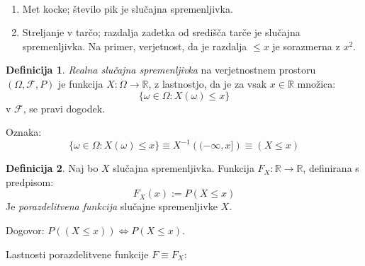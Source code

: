 \documentclass[12pt]{book}
\def\n{\noindent}
\theoremstyle{definition}
\newtheorem{definicija}{Definicija}
\theoremstyle{plain}
\theoremstyle{plain}
\theoremstyle{plain}
\theoremstyle{remark}
\begin{document}
\begin{zgled}
    ~

    \begin{enumerate} 
        \item Met kocke; število pik je slučajna spremenljivka.
        \item Streljanje v tarčo; razdalja zadetka od središča tarče je slučajna spremenljivka. 
        Na primer, verjetnost, da je razdalja $\leq x$ je sorazmerna z $x^2$.
    \end{enumerate}
\end{zgled}

\begin{definicija}
    \emph{Realna slučajna spremenljivka} na verjetnostnem prostoru $(\Omega, \mathcal{F}, P)$ je funkcija $X: \Omega \to \mathbb{R}$, z lastnostjo, da je za vsak $x \in \mathbb{R}$ množica:
    $$
    \{\omega \in \Omega: X(\omega) \leq x\}
    $$
    v $\mathcal{F}$, se pravi dogodek.
\end{definicija}

\n Oznaka: 
$$
\{\omega \in \Omega: X(\omega) \leq x\} \equiv X^{-1}\left((-\infty, x]\right) \equiv (X \leq x)
$$

\begin{definicija}
    Naj bo $X$ slučajna spremenljivka. Funkcija $F_X: \mathbb{R} \to \mathbb{R}$, definirana s predpisom: 
    $$
    F_X(x):=P(X \leq x)
    $$
    Je \emph{porazdelitvena funkcija} slučajne spremenljivke $X$.
\end{definicija}

\n Dogovor: $P((X \leq x)) \iff P(X \leq x)$.

\newpage

\n Lastnosti porazdelitvene funkcije $F \equiv F_X$:
\end{document}
